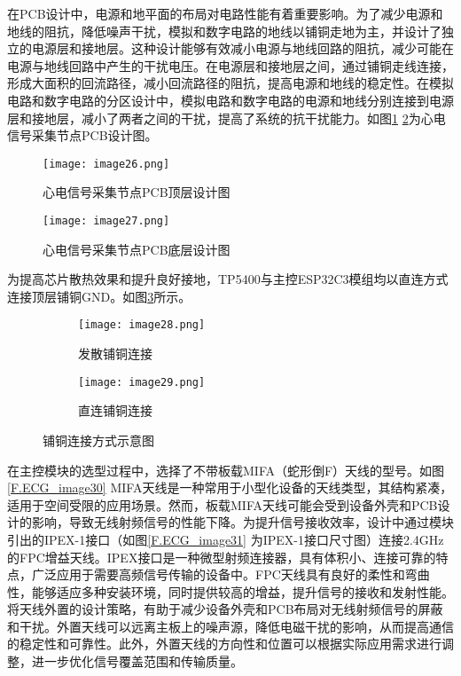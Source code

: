 在PCB设计中，电源和地平面的布局对电路性能有着重要影响。为了减少电源和地线的阻抗，降低噪声干扰，模拟和数字电路的地线以铺铜走地为主，并设计了独立的电源层和接地层。这种设计能够有效减小电源与地线回路的阻抗，减少可能在电源与地线回路中产生的干扰电压。在电源层和接地层之间，通过铺铜走线连接，形成大面积的回流路径，减小回流路径的阻抗，提高电源和地线的稳定性。在模拟电路和数字电路的分区设计中，模拟电路和数字电路的电源和地线分别连接到电源层和接地层，减小了两者之间的干扰，提高了系统的抗干扰能力。如图\ref{F.ECG_image26} \ref{F.ECG_image27}为心电信号采集节点PCB设计图。

\begin{figure}[hbt]
    \centering
    \texttt{[image: image26.png]}
    \caption{心电信号采集节点PCB顶层设计图}
    \label{F.ECG_image26}
\end{figure}

\begin{figure}[hbt]
    \centering
    \texttt{[image: image27.png]}
    \caption{心电信号采集节点PCB底层设计图}
    \label{F.ECG_image27}
\end{figure}

为提高芯片散热效果和提升良好接地，TP5400与主控ESP32C3模组均以直连方式连接顶层铺铜GND。如图\ref{F.ECG_image28}所示。

\begin{figure}[!htb]
    \centering
    \begin{subfigure}[t]{0.24\linewidth}
        \begin{minipage}[b]{1\linewidth}
        \texttt{[image: image28.png]}
        \caption{发散铺铜连接}
        \end{minipage}
    \end{subfigure}
    \begin{subfigure}[t]{0.24\linewidth}
        \begin{minipage}[b]{1\linewidth}
        \texttt{[image: image29.png]}
        \caption{直连铺铜连接}
        \end{minipage}
    \end{subfigure}
    \caption{铺铜连接方式示意图}
    \label{F.ECG_image28}
\end{figure}

在主控模块的选型过程中，选择了不带板载MIFA（蛇形倒F）天线的型号。如图\ref{F.ECG_image30} MIFA天线是一种常用于小型化设备的天线类型，其结构紧凑，适用于空间受限的应用场景。然而，板载MIFA天线可能会受到设备外壳和PCB设计的影响，导致无线射频信号的性能下降。为提升信号接收效率，设计中通过模块引出的IPEX-1接口（如图\ref{F.ECG_image31} 为IPEX-1接口尺寸图）连接2.4GHz的FPC增益天线。IPEX接口是一种微型射频连接器，具有体积小、连接可靠的特点，广泛应用于需要高频信号传输的设备中。FPC天线具有良好的柔性和弯曲性，能够适应多种安装环境，同时提供较高的增益，提升信号的接收和发射性能。将天线外置的设计策略，有助于减少设备外壳和PCB布局对无线射频信号的屏蔽和干扰。外置天线可以远离主板上的噪声源，降低电磁干扰的影响，从而提高通信的稳定性和可靠性。此外，外置天线的方向性和位置可以根据实际应用需求进行调整，进一步优化信号覆盖范围和传输质量。

